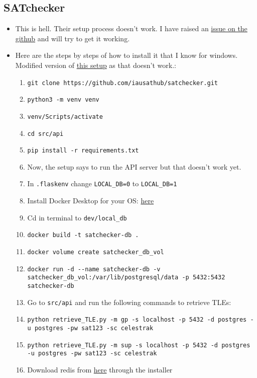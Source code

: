 \documentclass[../main.tex]{subfiles}
\begin{document}
\subsection{SATchecker}
\begin{itemize}
    \item This is hell. Their setup process doesn't work. I have raised an \href{https://github.com/iausathub/satchecker/issues/157}{issue on the github} and will try to get it working.
    \item Here are the steps by steps of how to install it that I know for windows. Modified version of \href{https://github.com/iausathub/satchecker/wiki/setup}{this setup} as that doesn't work.: \begin{enumerate}
        \item \verb|git clone https://github.com/iausathub/satchecker.git|
        \item \verb|python3 -m venv venv|
        \item \verb|venv/Scripts/activate|
        \item \verb|cd src/api|
        \item \verb|pip install -r requirements.txt|
        \item Now, the setup says to run the API server but that doesn't work yet.
        \item In \verb|.flaskenv| change \verb|LOCAL_DB=0| to \verb|LOCAL_DB=1|
        \item Install Docker Desktop for your OS: \href{https://www.docker.com/products/docker-desktop}{here}
        \item Cd in terminal to \verb|dev/local_db|
        \item \verb|docker build -t satchecker-db .|
        \item \verb|docker volume create satchecker_db_vol|
        \item \lstinline{docker run -d --name satchecker-db -v satchecker_db_vol:/var/lib/postgresql/data -p 5432:5432 satchecker-db} 
        \item Go to \verb|src/api| and run the following commands to retrieve TLEs:
        \item \lstinline{python retrieve_TLE.py -m gp -s localhost -p 5432 -d postgres -u postgres -pw sat123 -sc celestrak}
        \item \lstinline{python retrieve_TLE.py -m sup -s localhost -p 5432 -d postgres -u postgres -pw sat123 -sc celestrak}
        \item Download redis from \href{https://github.com/tporadowski/redis/releases}{here} through the installer

\end{enumerate}
\end{itemize}
\end{document}
